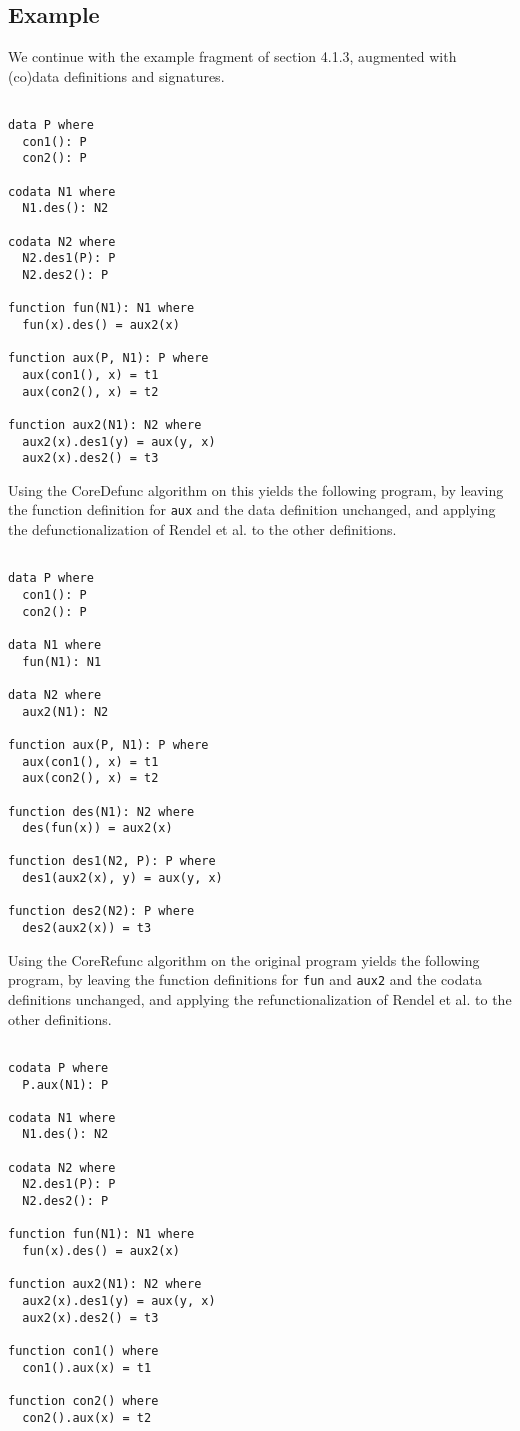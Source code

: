 \subsection{Example}

We continue with the example fragment of section 4.1.3, augmented with (co)data definitions and signatures.

\begin{lstlisting}

data P where
  con1(): P
  con2(): P

codata N1 where
  N1.des(): N2

codata N2 where
  N2.des1(P): P
  N2.des2(): P

function fun(N1): N1 where
  fun(x).des() = aux2(x)

function aux(P, N1): P where
  aux(con1(), x) = t1
  aux(con2(), x) = t2

function aux2(N1): N2 where
  aux2(x).des1(y) = aux(y, x)
  aux2(x).des2() = t3

\end{lstlisting}

Using the \textsf{CoreDefunc} algorithm on this yields the following program, by leaving the function definition for \texttt{aux} and the data definition unchanged, and applying the defunctionalization of Rendel et al. to the other definitions.

\begin{lstlisting}

data P where
  con1(): P
  con2(): P

data N1 where
  fun(N1): N1

data N2 where
  aux2(N1): N2

function aux(P, N1): P where
  aux(con1(), x) = t1
  aux(con2(), x) = t2

function des(N1): N2 where
  des(fun(x)) = aux2(x)

function des1(N2, P): P where
  des1(aux2(x), y) = aux(y, x)

function des2(N2): P where
  des2(aux2(x)) = t3

\end{lstlisting}

Using the \textsf{CoreRefunc} algorithm on the original program yields the following program, by leaving the function definitions for \texttt{fun} and \texttt{aux2} and the codata definitions unchanged, and applying the refunctionalization of Rendel et al. to the other definitions.

\begin{lstlisting}

codata P where
  P.aux(N1): P

codata N1 where
  N1.des(): N2

codata N2 where
  N2.des1(P): P
  N2.des2(): P

function fun(N1): N1 where
  fun(x).des() = aux2(x)

function aux2(N1): N2 where
  aux2(x).des1(y) = aux(y, x)
  aux2(x).des2() = t3

function con1() where
  con1().aux(x) = t1

function con2() where
  con2().aux(x) = t2

\end{lstlisting}

